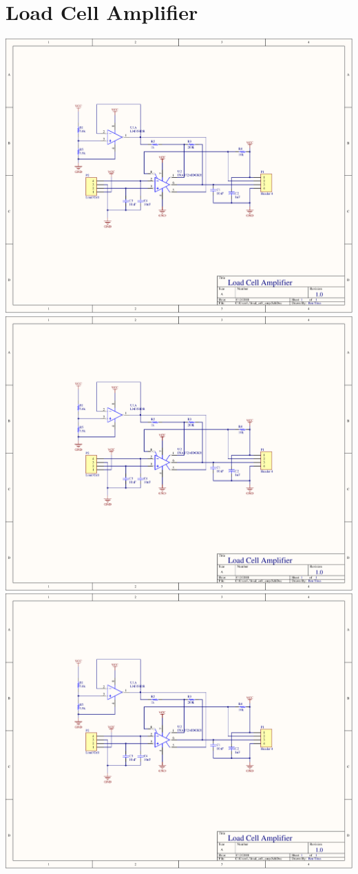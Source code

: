 \section{Load Cell Amplifier}
\label{app:load_cell_amp}
\centering
\includegraphics[page=1,width=\textwidth,angle=270]{PDFs/load_cell_amp.PDF} \newpage
\includegraphics[page=2,width=\textwidth,angle=270]{PDFs/load_cell_amp.PDF} \newpage
\includegraphics[page=3,width=\textwidth,angle=270]{PDFs/load_cell_amp.PDF} \newpage